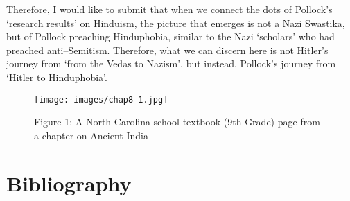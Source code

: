 Therefore, I would like to submit that when we connect the dots of Pollock’s ‘research results’ on Hinduism, the picture that emerges is not a Nazi Swastika, but of Pollock preaching Hinduphobia, similar to the Nazi ‘scholars’ who had preached anti–Semitism. Therefore, what we can discern here is not Hitler’s journey from ‘from the Vedas to Nazism’, but instead, Pollock’s journey from ‘Hitler to Hinduphobia’.

\begin{figure}
\texttt{[image: images/chap8–1.jpg]}
\caption{Figure 1: A North Carolina school textbook (9th Grade) page from a chapter on Ancient India}
\end{figure}


\section*{Bibliography}

